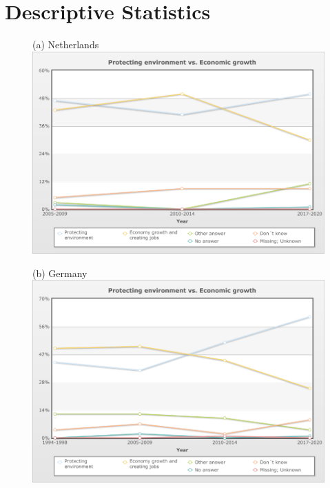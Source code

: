 \documentclass[12pt]{article}
\begin{document}
\section{Descriptive Statistics}

\begin{figure}[h!!]	
	\begin{minipage}[h!!]{0.4\textwidth}  
		\centering\footnotesize{(a) Netherlands}
		\includegraphics[width=1\textwidth]{../Data/data_Netherlands_priorities.png}
	\end{minipage}
	\begin{minipage}[h!!]{0.4\textwidth}  
		\centering\footnotesize{(b) Germany}
		\includegraphics[width=1\textwidth]{../Data/data_germany_priorities.png}
	\end{minipage}

\end{figure}
\end{document}
